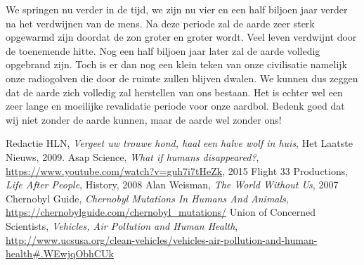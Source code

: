 \newline
We springen nu verder in de tijd, we zijn nu vier en een half biljoen jaar verder na het verdwijnen van de mens. Na deze periode zal de aarde zeer sterk opgewarmd zijn doordat de zon groter en groter wordt. Veel leven verdwijnt door de toenemende hitte. Nog een half biljoen jaar later zal de aarde volledig opgebrand zijn. Toch is er dan nog een klein teken van onze civilisatie namelijk onze radiogolven die door de ruimte zullen blijven dwalen.
\newline
\newline
We kunnen dus zeggen dat de aarde zich volledig zal herstellen van ons bestaan. Het is echter wel een zeer lange en moeilijke revalidatie periode voor onze aardbol. Bedenk goed dat wij niet zonder de aarde kunnen, maar de aarde wel zonder ons!
\newpage
\begin{thebibliography}{9}

  Redactie HLN,
  \emph{Vergeet uw trouwe hond, haal een halve wolf in huis},
  Het Laatste Nieuws,
  2009.
  Asap Science,
  \emph{What if humans disappeared?},
  \url{https://www.youtube.com/watch?v=guh7i7tHeZk},
  2015
	Flight 33 Productions,
    \emph{Life After People},
    History,
    2008
	Alan Weisman,
	\emph{The World Without Us},
	2007
	Chernobyl Guide,
	\emph{Chernobyl Mutations In Humans And Animals},
	\url{https://chernobylguide.com/chernobyl_mutations/}
	Union of Concerned Scientists,
	\emph{Vehicles, Air Pollution and Human Health},
	\url{http://www.ucsusa.org/clean-vehicles/vehicles-air-pollution-and-human-health#.WEwjqObhCUk}
	
\end{thebibliography}


